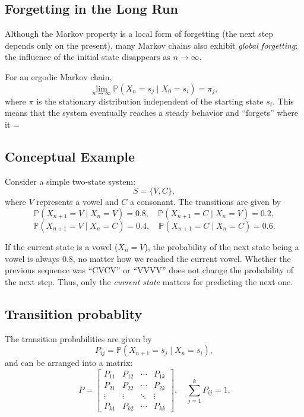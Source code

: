 \subsection*{Forgetting in the Long Run}

Although the Markov property is a local form of forgetting (the next step depends 
only on the present), many Markov chains also exhibit \emph{global forgetting}: 
the influence of the initial state disappears as $n \to \infty$. 

For an ergodic Markov chain,
\[
\lim_{n \to \infty} \mathbb{P}(X_n = s_j \mid X_0 = s_i) = \pi_j,
\]
where $\pi$ is the stationary distribution independent of the starting state $s_i$.
This means that the system eventually reaches a steady behavior and ``forgets'' 
where it	=

\subsection*{Conceptual Example}

Consider a simple two-state system:
\[
S = \{V, C\},
\]
where $V$ represents a vowel and $C$ a consonant. The transitions are given by
\[
\mathbb{P}(X_{n+1}=V \mid X_n=V) = 0.8, \quad
\mathbb{P}(X_{n+1}=C \mid X_n=V) = 0.2,
\]
\[
\mathbb{P}(X_{n+1}=V \mid X_n=C) = 0.4, \quad
\mathbb{P}(X_{n+1}=C \mid X_n=C) = 0.6.
\]

If the current state is a vowel ($X_n = V$), the probability of the next state being 
a vowel is always $0.8$, no matter how we reached the current vowel. Whether the 
previous sequence was ``CVCV'' or ``VVVV'' does not change the probability of the 
next step. Thus, only the \emph{current state} matters for predicting the next one.



\subsection{Transiition probablity}



The transition probabilities are given by
\[
P_{ij} = \mathbb{P}(X_{n+1} = s_j \mid X_n = s_i),
\]
and can be arranged into a matrix:
\[
P =
\begin{bmatrix}
P_{11} & P_{12} & \cdots & P_{1k} \\
P_{21} & P_{22} & \cdots & P_{2k} \\
\vdots & \vdots & \ddots & \vdots \\
P_{k1} & P_{k2} & \cdots & P_{kk}
\end{bmatrix}, \quad
\sum_{j=1}^{k} P_{ij} = 1.
\]



